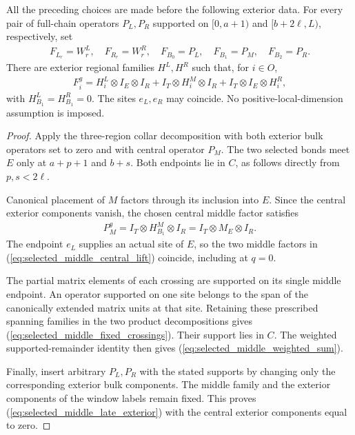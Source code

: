 \begin{lemma}
    All the preceding choices are made before the following exterior data.
    For every pair of full-chain operators $P_L,P_R$ supported on
    $[0,a+1)$ and
    $[b+2\ell,L)$, respectively, set
    \begin{align}
        F_{L_r}=W^L_r,\quad F_{R_r}=W^R_r,\quad
        F_{B_0}=P_L,\quad F_{B_1}=P_M,\quad F_{B_2}=P_R.
        \label{eq:selected_middle_full_family}
    \end{align}
    There are exterior regional families $H^L,H^R$ such that, for $i\in O$,
    \begin{align}
        F_i^g=H_i^L\otimes I_E\otimes I_R
        +I_T\otimes H_i^M\otimes I_R
        +I_T\otimes I_E\otimes H_i^R,
        \label{eq:selected_middle_late_exterior}
    \end{align}
    with $H^L_{B_1}=H^R_{B_1}=0$.
    The sites $e_L,e_R$ may coincide. No positive-local-dimension assumption
    is imposed.
\end{lemma}
\begin{proof}\leanok
    Apply the three-region collar decomposition with both exterior bulk
    operators set to zero and with central operator $P_M$.
    The two selected bonds meet $E$ only at $a+p+1$ and $b+s$.
    Both endpoints lie in $C$, as follows directly from $p,s<2\ell$.

    Canonical placement of $M$ factors through its inclusion into $E$.
    Since the central exterior components vanish, the chosen central middle
    factor satisfies
    \begin{align}
        P_M^g=I_T\otimes H^M_{B_1}\otimes I_R
        =I_T\otimes M_E\otimes I_R.
        \label{eq:selected_middle_central_lift}
    \end{align}
    The endpoint $e_L$ supplies an actual site of $E$, so the two middle
    factors in (\ref{eq:selected_middle_central_lift}) coincide,
    including at $q=0$.

    The partial matrix elements of each crossing are supported on its single
    middle endpoint. An operator supported on one site belongs to the span of
    the canonically extended matrix units at that site. Retaining these
    prescribed spanning families in the two product decompositions gives
    (\ref{eq:selected_middle_fixed_crossings}). Their support lies in $C$.
    The weighted supported-remainder identity then gives
    (\ref{eq:selected_middle_weighted_sum}).

    Finally, insert arbitrary $P_L,P_R$ with the stated supports by changing
    only the corresponding exterior bulk components. The middle family and
    the exterior components of the window labels remain fixed. This proves
    (\ref{eq:selected_middle_late_exterior}) with the central exterior
    components equal to zero.
\end{proof}
